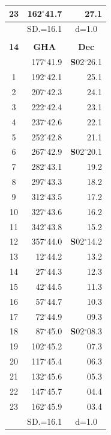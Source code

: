 \documentclass[10pt, a4paper]{report}
\begin{document}
\begin{scriptsize}
\begin{tabular*}{0.2\textwidth}[t]{@{\extracolsep{\fill}}|c|rr|}
23 & 162$^\circ$41.7 & 27.1\\
\hline
\rule{0pt}{2.4ex} & \multicolumn{1}{c}{SD.=16.1} & \multicolumn{1}{c|}{d=1.0}\\
\hline
\multicolumn{1}{c}{}\\[-0.5ex]\hline
\multicolumn{1}{|c|}{\rule{0pt}{2.6ex}\textbf{14}} & \multicolumn{1}{c}{\textbf{GHA}} & \multicolumn{1}{c|}{\textbf{Dec}}\\
\hline\rule{0pt}{2.6ex}\noindent
0 & 177$^\circ$41.9 & \textbf{S}02$^\circ$26.1\\
1 & 192$^\circ$42.1 & 25.1\\
2 & 207$^\circ$42.3 & 24.1\\
3 & 222$^\circ$42.4 & \raisebox{0.24ex}{\boldmath$\cdot$~\boldmath$\cdot$~~}23.1\\
4 & 237$^\circ$42.6 & 22.1\\
5 & 252$^\circ$42.8 & 21.1\\[2Pt]
6 & 267$^\circ$42.9 & \textbf{S}02$^\circ$20.1\\
7 & 282$^\circ$43.1 & 19.2\\
8 & 297$^\circ$43.3 & 18.2\\
9 & 312$^\circ$43.5 & \raisebox{0.24ex}{\boldmath$\cdot$~\boldmath$\cdot$~~}17.2\\
10 & 327$^\circ$43.6 & 16.2\\
11 & 342$^\circ$43.8 & 15.2\\[2Pt]
12 & 357$^\circ$44.0 & \textbf{S}02$^\circ$14.2\\
13 & 12$^\circ$44.2 & 13.2\\
14 & 27$^\circ$44.3 & 12.3\\
15 & 42$^\circ$44.5 & \raisebox{0.24ex}{\boldmath$\cdot$~\boldmath$\cdot$~~}11.3\\
16 & 57$^\circ$44.7 & 10.3\\
17 & 72$^\circ$44.9 & 09.3\\[2Pt]
18 & 87$^\circ$45.0 & \textbf{S}02$^\circ$08.3\\
19 & 102$^\circ$45.2 & 07.3\\
20 & 117$^\circ$45.4 & 06.3\\
21 & 132$^\circ$45.6 & \raisebox{0.24ex}{\boldmath$\cdot$~\boldmath$\cdot$~~}05.3\\
22 & 147$^\circ$45.7 & 04.4\\
23 & 162$^\circ$45.9 & 03.4\\
\hline
\rule{0pt}{2.4ex} & \multicolumn{1}{c}{SD.=16.1} & \multicolumn{1}{c|}{d=1.0}\\
\hline
\end{tabular*}\noindent

\end{scriptsize}
\end{document}
